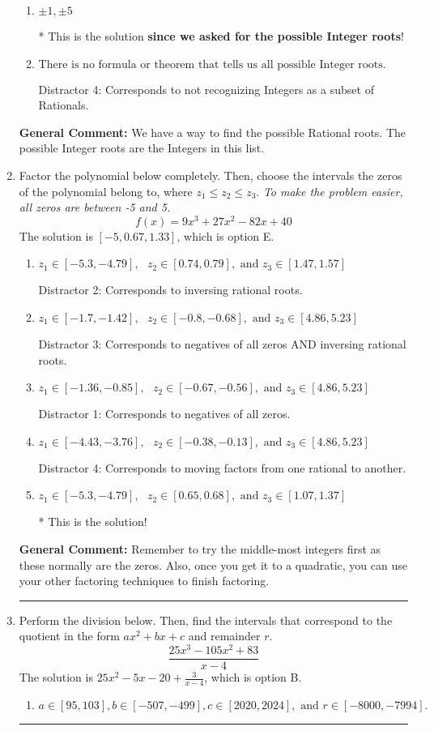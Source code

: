 \documentclass{extbook}[14pt]
\newcommand{\litem}[1]{\item #1

\rule{\textwidth}{0.4pt}}
\begin{document}
\begin{enumerate}
{\begin{enumerate}[label=\Alph*.]
 Distractor 3: Corresponds to the plus or minus of the inverse quotient (an/a0) of the factors. 
\item \( \pm 1,\pm 5 \)

* This is the solution \textbf{since we asked for the possible Integer roots}!
\item \( \text{There is no formula or theorem that tells us all possible Integer roots.} \)

 Distractor 4: Corresponds to not recognizing Integers as a subset of Rationals.
\end{enumerate}

\textbf{General Comment:} We have a way to find the possible Rational roots. The possible Integer roots are the Integers in this list.
}
\litem{
Factor the polynomial below completely. Then, choose the intervals the zeros of the polynomial belong to, where $z_1 \leq z_2 \leq z_3$. \textit{To make the problem easier, all zeros are between -5 and 5.}
\[ f(x) = 9x^{3} +27 x^{2} -82 x + 40 \]The solution is \( [-5, 0.67, 1.33] \), which is option E.\begin{enumerate}[label=\Alph*.]
\item \( z_1 \in [-5.3, -4.79], \text{   }  z_2 \in [0.74, 0.79], \text{   and   } z_3 \in [1.47, 1.57] \)

 Distractor 2: Corresponds to inversing rational roots.
\item \( z_1 \in [-1.7, -1.42], \text{   }  z_2 \in [-0.8, -0.68], \text{   and   } z_3 \in [4.86, 5.23] \)

 Distractor 3: Corresponds to negatives of all zeros AND inversing rational roots.
\item \( z_1 \in [-1.36, -0.85], \text{   }  z_2 \in [-0.67, -0.56], \text{   and   } z_3 \in [4.86, 5.23] \)

 Distractor 1: Corresponds to negatives of all zeros.
\item \( z_1 \in [-4.43, -3.76], \text{   }  z_2 \in [-0.38, -0.13], \text{   and   } z_3 \in [4.86, 5.23] \)

 Distractor 4: Corresponds to moving factors from one rational to another.
\item \( z_1 \in [-5.3, -4.79], \text{   }  z_2 \in [0.65, 0.68], \text{   and   } z_3 \in [1.07, 1.37] \)

* This is the solution!
\end{enumerate}

\textbf{General Comment:} Remember to try the middle-most integers first as these normally are the zeros. Also, once you get it to a quadratic, you can use your other factoring techniques to finish factoring.
}
\litem{
Perform the division below. Then, find the intervals that correspond to the quotient in the form $ax^2+bx+c$ and remainder $r$.
\[ \frac{25x^{3} -105 x^{2} + 83}{x -4} \]The solution is \( 25x^{2} -5 x -20 + \frac{3}{x -4} \), which is option B.\begin{enumerate}[label=\Alph*.]
\item \( a \in [95, 103], b \in [-507, -499], c \in [2020, 2024], \text{ and } r \in [-8000, -7994]. \)


\end{enumerate}}
\end{enumerate}
\end{document}
